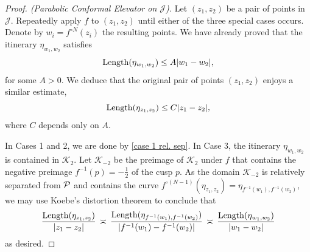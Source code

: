 \begin{proof}[Proof. (Parabolic Conformal Elevator on $\mathcal J$)] \label{parabolic-elevator}
Let  $(z_1,z_2)$ be a pair of points in $\mathcal J$. Repeatedly apply $f$ to $(z_1, z_2)$ until either of the three special cases occurs. Denote by $w_i=f^{\circ N}(z_i)$ the resulting points. We have already proved that the itinerary $\eta_{w_1,w_2}$ satisfies
\begin{equation*}
	\operatorname{Length}(\eta_{w_1,w_2}) \leq A |w_1-w_2|,
\end{equation*}
for some $A>0$. We deduce that the original pair of points $(z_1,z_2)$ enjoys a similar estimate,
\begin{equation*}
	\operatorname{Length}(\eta_{z_1,z_2}) \leq C |z_1-z_2|,
\end{equation*}
where $C$ depends only on $A$.

In Cases 1 and 2, we are done by \cref{case 1 rel. sep}. In Case 3, 
the itinerary $\eta_{w_1,w_2}$ is contained in $\mathcal K_2$. Let $\mathcal K_{-2}$ be the preimage of $\mathcal K_2$ under $f$ that contains the negative preimage $f^{-1}(p)=-\tfrac 12$ of the cusp $p$. 
As the domain $\mathcal K_{-2}$ is relatively separated from $\operatorname{\mathcal P}$ and contains the curve 
$f^{\circ (N-1)}(\eta_{z_1,z_2}) = \eta_{f^{-1}(w_1),f^{-1}(w_2)}$,
we may use Koebe's distortion theorem to conclude that
\begin{equation}
	\frac{\operatorname{Length}(\eta_{z_1,z_2})}{|z_1-z_2|} \, \asymp \,
		\frac{\operatorname{Length}(\eta_{f^{-1}(w_1),f^{-1}(w_2)})}{|f^{-1}(w_1)-f^{-1}(w_2)|} \, \asymp \,
		\frac{\operatorname{Length}(\eta_{w_1,w_2})}{|w_1-w_2|}
\end{equation}
as desired.
\end{proof}




\printnomenclature

